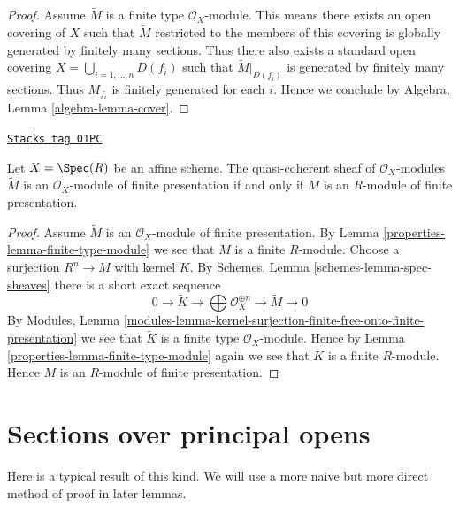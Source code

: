\begin{proof}
Assume $\widetilde M$ is a finite type $\mathcal{O}_X$-module.
This means there exists an open covering of $X$ such that
$\widetilde M$ restricted to the members of this covering is
globally generated by finitely many sections.
Thus there also exists a standard open covering
$X = \bigcup_{i = 1, \ldots, n} D(f_i)$ such that $\widetilde M|_{D(f_i)}$
is generated by finitely many sections. Thus $M_{f_i}$ is finitely
generated for each $i$. Hence we conclude by
Algebra, Lemma \ref{algebra-lemma-cover}.
\end{proof}

\begin{lemma}
\label{properties-lemma-finite-presentation-module}
\href{https://stacks.math.columbia.edu/tag/01PC}{\texttt{Stacks tag 01PC}}

Let $X = \Spec(R)$ be an affine scheme. The quasi-coherent sheaf
of $\mathcal{O}_X$-modules $\widetilde M$ is an $\mathcal{O}_X$-module of
finite presentation if and only if $M$ is an $R$-module of finite presentation.
\end{lemma}

\begin{proof}

Assume $\widetilde M$ is an $\mathcal{O}_X$-module of finite presentation.
By Lemma \ref{properties-lemma-finite-type-module} we see that $M$ is a finite $R$-module.
Choose a surjection $R^n \to M$ with kernel $K$. By
Schemes, Lemma \ref{schemes-lemma-spec-sheaves}
there is a short exact sequence
$$
0 \to \widetilde{K} \to
\bigoplus \mathcal{O}_X^{\oplus n} \to
\widetilde{M} \to 0
$$
By
Modules, Lemma
\ref{modules-lemma-kernel-surjection-finite-free-onto-finite-presentation}
we see that $\widetilde{K}$ is a finite type $\mathcal{O}_X$-module.
Hence by Lemma \ref{properties-lemma-finite-type-module}
again we see that $K$ is a finite $R$-module.
Hence $M$ is an $R$-module of finite presentation.
\end{proof}

\section{Sections over principal opens}
\label{properties-section-principal-opens}
Here is a typical result of this kind. We will use a more naive but
more direct method of proof in later lemmas.

